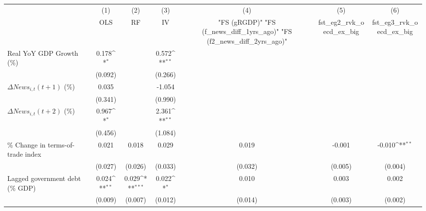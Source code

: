 {
\def\sym#1{\ifmmode^{#1}\else\(^{#1}\)\fi}
\begin{tabular}{l*{6}{c}}
\toprule
                    &\multicolumn{1}{c}{(1)}&\multicolumn{1}{c}{(2)}&\multicolumn{1}{c}{(3)}&\multicolumn{1}{c}{(4)}&\multicolumn{1}{c}{(5)}&\multicolumn{1}{c}{(6)}\\
                    &\multicolumn{1}{c}{OLS}&\multicolumn{1}{c}{RF}&\multicolumn{1}{c}{IV}&\multicolumn{1}{c}{ "FS (gRGDP)"  "FS (f_news_diff_1yrs_ago)"  "FS (f2_news_diff_2yrs_ago)" }&\multicolumn{1}{c}{fst_eg2_rvk_oecd_ex_big}&\multicolumn{1}{c}{fst_eg3_rvk_oecd_ex_big}\\
\midrule
Real YoY GDP Growth (\%)&       0.178\sym{*}  &                     &       0.572\sym{**} &                     &                     &                     \\
                    &     (0.092)         &                     &     (0.266)         &                     &                     &                     \\
\addlinespace
$ \Delta News_{i,t}(t+1)$ (\%)&       0.035         &                     &      -1.054         &                     &                     &                     \\
                    &     (0.341)         &                     &     (0.990)         &                     &                     &                     \\
\addlinespace
$ \Delta News_{i,t}(t+2)$ (\%)&       0.967\sym{*}  &                     &       2.361\sym{**} &                     &                     &                     \\
                    &     (0.456)         &                     &     (1.084)         &                     &                     &                     \\
\addlinespace
\% Change in terms-of-trade index&       0.021         &       0.018         &       0.029         &       0.019         &      -0.001         &      -0.010\sym{**} \\
                    &     (0.027)         &     (0.026)         &     (0.033)         &     (0.032)         &     (0.005)         &     (0.004)         \\
\addlinespace
Lagged government debt (\% GDP)&       0.024\sym{**} &       0.029\sym{***}&       0.022\sym{*}  &       0.010         &       0.003         &       0.002         \\
                    &     (0.009)         &     (0.007)         &     (0.012)         &     (0.014)         &     (0.003)         &     (0.002)         \\

\end{tabular}}
